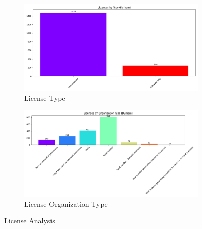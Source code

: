 \documentclass[journal,onecolumn, 10pt,draftclsnofoot]{IEEEtran}
\begin{document}
\begin{figure}[h]
    \centering
    \begin{subfigure}[b]{0.48\textwidth}
        \centering
        \includegraphics[width=\linewidth]{Fig/figure21.license_type.png}
        \caption{License Type}
        \label{fig:license-type}
    \end{subfigure}
    \hfill
    \begin{subfigure}[b]{0.48\textwidth}
        \centering
        \includegraphics[width=\linewidth]{Fig/figure22.license_org_type.png}
        \caption{License Organization Type}
        \label{fig:license-org-type}
    \end{subfigure}
    \vspace{0.6cm}
    \caption{License Analysis}
    \label{fig:license-analysis}
\end{figure}
\end{document}
